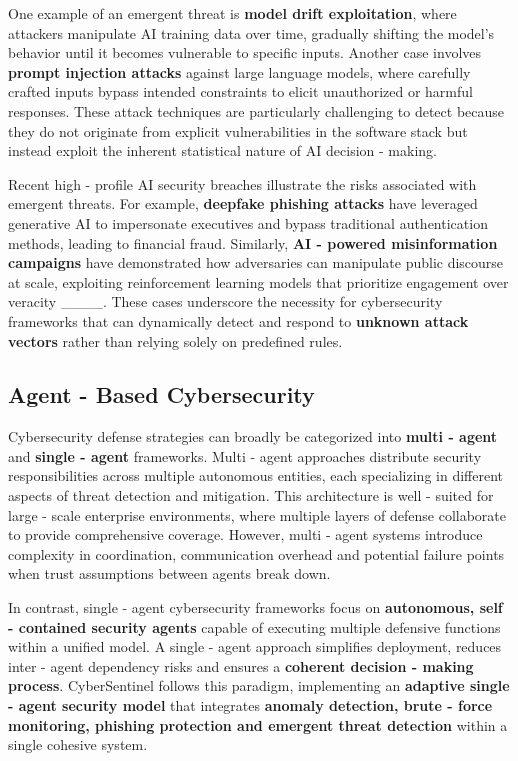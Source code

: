 One example of an emergent threat is \textbf{model drift exploitation}, where attackers manipulate AI training data over time, gradually shifting the model’s behavior until it becomes vulnerable to specific inputs. Another case involves \textbf{prompt injection attacks} against large language models, where carefully crafted inputs bypass intended constraints to elicit unauthorized or harmful responses. These attack techniques are particularly challenging to detect because they do not originate from explicit vulnerabilities in the software stack but instead exploit the inherent statistical nature of AI decision - making.

Recent high - profile AI security breaches illustrate the risks associated with emergent threats. For example, \textbf{deepfake phishing attacks} have leveraged generative AI to impersonate executives and bypass traditional authentication methods, leading to financial fraud. Similarly, \textbf{AI - powered misinformation campaigns} have demonstrated how adversaries can manipulate public discourse at scale, exploiting reinforcement learning models that prioritize engagement over veracity ____. These cases underscore the necessity for cybersecurity frameworks that can dynamically detect and respond to \textbf{unknown attack vectors} rather than relying solely on predefined rules.

\subsection{Agent - Based Cybersecurity}
Cybersecurity defense strategies can broadly be categorized into \textbf{multi - agent} and \textbf{single - agent} frameworks. Multi - agent approaches distribute security responsibilities across multiple autonomous entities, each specializing in different aspects of threat detection and mitigation. This architecture is well - suited for large - scale enterprise environments, where multiple layers of defense collaborate to provide comprehensive coverage. However, multi - agent systems introduce complexity in coordination, communication overhead and potential failure points when trust assumptions between agents break down.

In contrast, single - agent cybersecurity frameworks focus on \textbf{autonomous, self - contained security agents} capable of executing multiple defensive functions within a unified model. A single - agent approach simplifies deployment, reduces inter - agent dependency risks and ensures a \textbf{coherent decision - making process}. CyberSentinel follows this paradigm, implementing an \textbf{adaptive single - agent security model} that integrates \textbf{anomaly detection, brute - force monitoring, phishing protection and emergent threat detection} within a single cohesive system.

